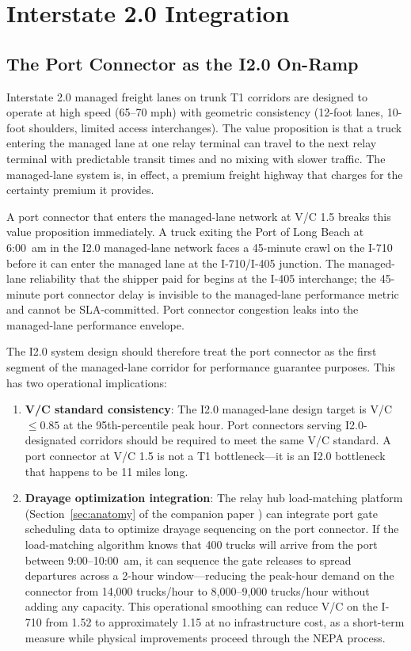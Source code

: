 \section{Interstate 2.0 Integration}
\label{sec:i2}

\subsection{The Port Connector as the I2.0 On-Ramp}

Interstate 2.0 managed freight lanes on trunk T1 corridors are designed to operate at high speed (65--70 mph) with geometric consistency (12-foot lanes, 10-foot shoulders, limited access interchanges). The value proposition is that a truck entering the managed lane at one relay terminal can travel to the next relay terminal with predictable transit times and no mixing with slower traffic. The managed-lane system is, in effect, a premium freight highway that charges for the certainty premium it provides.

A port connector that enters the managed-lane network at V/C 1.5 breaks this value proposition immediately. A truck exiting the Port of Long Beach at 6:00~am in the I2.0 managed-lane network faces a 45-minute crawl on the I-710 before it can enter the managed lane at the I-710/I-405 junction. The managed-lane reliability that the shipper paid for begins at the I-405 interchange; the 45-minute port connector delay is invisible to the managed-lane performance metric and cannot be SLA-committed. Port connector congestion leaks into the managed-lane performance envelope.

The I2.0 system design should therefore treat the port connector as the first segment of the managed-lane corridor for performance guarantee purposes. This has two operational implications:

\begin{enumerate}
  \item \textbf{V/C standard consistency}: The I2.0 managed-lane design target is V/C $\leq 0.85$ at the 95th-percentile peak hour. Port connectors serving I2.0-designated corridors should be required to meet the same V/C standard. A port connector at V/C 1.5 is not a T1 bottleneck---it is an I2.0 bottleneck that happens to be 11 miles long.

  \item \textbf{Drayage optimization integration}: The relay hub load-matching platform (Section~\ref{sec:anatomy} of the companion paper \citep{ROUTE_C3}) can integrate port gate scheduling data to optimize drayage sequencing on the port connector. If the load-matching algorithm knows that 400 trucks will arrive from the port between 9:00--10:00~am, it can sequence the gate releases to spread departures across a 2-hour window---reducing the peak-hour demand on the connector from 14,000 trucks/hour to 8,000--9,000 trucks/hour without adding any capacity. This operational smoothing can reduce V/C on the I-710 from 1.52 to approximately 1.15 at no infrastructure cost, as a short-term measure while physical improvements proceed through the NEPA process.
\end{enumerate}

